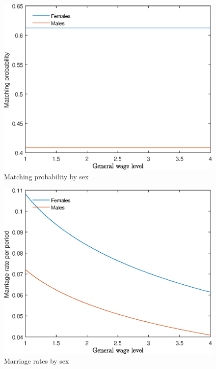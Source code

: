 \documentclass[12pt]{article}
\begin{document}
\begin{figure}
	\centering
	\caption{Matching probability by sex}
	\includegraphics{Graphs/match_prob_general_wage_ex1.eps}
\end{figure}

\begin{figure}
	\centering
	\caption{Marriage rates by sex}
	\includegraphics{Graphs/marr_rates_general_wage_ex1.eps}
\end{figure}
\end{document}

